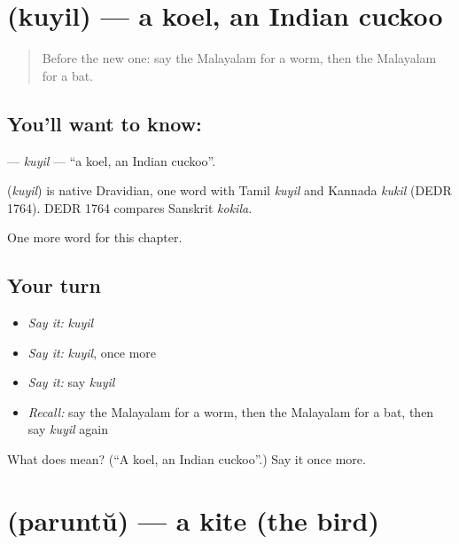 \section[\texorpdfstring{\ml{കുയിൽ} (kuyil)}{കുയിൽ (kuyil)}]{ (kuyil) — a koel, an Indian cuckoo}

\label{lesson:ML-C213-kuyil}



\begin{quote}
Before the new one: say the Malayalam for a worm, then the Malayalam for a bat.
\end{quote}

\subsection*{You'll want to know: }
\textbf{} — \emph{kuyil} — \textquotedblleft{}a koel, an Indian cuckoo\textquotedblright{}.

\begin{cousinweb}
\textbf{} (\emph{kuyil}) is native Dravidian, one word with Tamil \emph{kuyil} and Kannada \emph{kukil} (DEDR 1764). DEDR 1764 compares Sanskrit \emph{kokila}.
\end{cousinweb}

\begin{grammarlens}[title={What you've built}]
One more word for this chapter.
\end{grammarlens}

\subsection*{Your turn}
\begin{itemize}
\raggedright
  \item \emph{Say it:} \emph{kuyil}
  \item \emph{Say it:} \emph{kuyil}, once more
  \item \emph{Say it:} say \emph{kuyil}
  \item \emph{Recall:} say the Malayalam for a worm, then the Malayalam for a bat, then say \emph{kuyil} again
\end{itemize}

\begin{tcolorbox}[breakable,colback=teal!4,colframe=teal!35!black,title={Before you move on}]
What does  mean? (\textquotedblleft{}A koel, an Indian cuckoo\textquotedblright{}.) Say it once more.
\end{tcolorbox}
\section[\texorpdfstring{\ml{പരുന്ത്} (paruntŭ)}{പരുന്ത് (paruntŭ)}]{ (paruntŭ) — a kite (the bird)}

